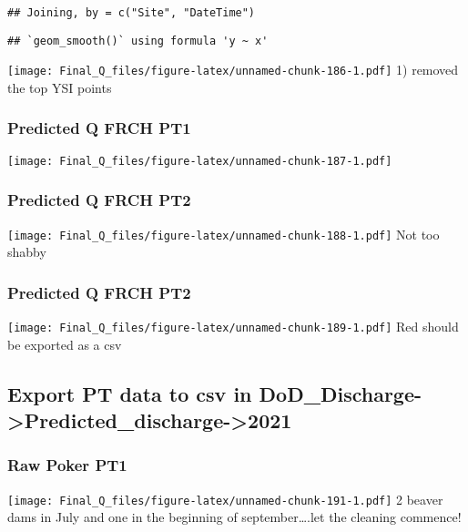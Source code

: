 \documentclass[
]{article}
\begin{document}
\begin{verbatim}
## Joining, by = c("Site", "DateTime")
\end{verbatim}

\begin{verbatim}
## `geom_smooth()` using formula 'y ~ x'
\end{verbatim}

\texttt{[image: Final\_Q\_files/figure-latex/unnamed-chunk-186-1.pdf]} 1)
removed the top YSI points

\hypertarget{predicted-q-frch-pt1-1}{%
\subsubsection{Predicted Q FRCH PT1}\label{predicted-q-frch-pt1-1}}

\texttt{[image: Final\_Q\_files/figure-latex/unnamed-chunk-187-1.pdf]}

\hypertarget{predicted-q-frch-pt2-1}{%
\subsubsection{Predicted Q FRCH PT2}\label{predicted-q-frch-pt2-1}}

\texttt{[image: Final\_Q\_files/figure-latex/unnamed-chunk-188-1.pdf]} Not
too shabby

\hypertarget{predicted-q-frch-pt2-2}{%
\subsubsection{Predicted Q FRCH PT2}\label{predicted-q-frch-pt2-2}}

\texttt{[image: Final\_Q\_files/figure-latex/unnamed-chunk-189-1.pdf]} Red
should be exported as a csv

\hypertarget{export-pt-data-to-csv-in-dod_discharge-predicted_discharge-2021-1}{%
\subsection{Export PT data to csv in
DoD\_Discharge-\textgreater Predicted\_discharge-\textgreater2021}\label{export-pt-data-to-csv-in-dod_discharge-predicted_discharge-2021-1}}

\hypertarget{raw-poker-pt1-2}{%
\subsubsection{Raw Poker PT1}\label{raw-poker-pt1-2}}

\texttt{[image: Final\_Q\_files/figure-latex/unnamed-chunk-191-1.pdf]} 2
beaver dams in July and one in the beginning of september\ldots.let the
cleaning commence!
\end{document}

